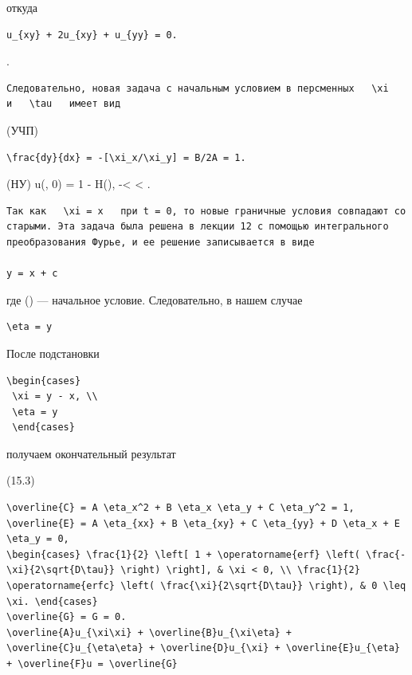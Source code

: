 \documentclass[
  ukrainian,
]{article}
\begin{document}
откуда

\begin{verbatim}
u_{xy} + 2u_{xy} + u_{yy} = 0.
\end{verbatim}

.

\begin{verbatim}
Следовательно, новая задача с начальным условием в персменных   \xi   и   \tau   имеет вид
\end{verbatim}

(УЧП)

\begin{verbatim}
\frac{dy}{dx} = -[\xi_x/\xi_y] = B/2A = 1.
\end{verbatim}

(НУ) u(\xi, 0) = 1 - H(\xi), \quad -\infty \textless{} \xi \textless{}
\infty.

\begin{verbatim}
Так как   \xi = x   при t = 0, то новые граничные условия совпадают со старыми. Эта задача была решена в лекции 12 с помощью интегрального преобразования Фурье, и ее решение записывается в виде

y = x + c
\end{verbatim}

где \phi(\beta) --- начальное условие. Следовательно, в нашем случае

\begin{verbatim}
\eta = y
\end{verbatim}

После подстановки

\begin{verbatim}
\begin{cases}
 \xi = y - x, \\
 \eta = y
 \end{cases}
\end{verbatim}

получаем окончательный результат

(15.3)

\begin{verbatim}
\overline{C} = A \eta_x^2 + B \eta_x \eta_y + C \eta_y^2 = 1,
\overline{E} = A \eta_{xx} + B \eta_{xy} + C \eta_{yy} + D \eta_x + E \eta_y = 0,
\begin{cases} \frac{1}{2} \left[ 1 + \operatorname{erf} \left( \frac{-\xi}{2\sqrt{D\tau}} \right) \right], & \xi < 0, \\ \frac{1}{2} \operatorname{erfc} \left( \frac{\xi}{2\sqrt{D\tau}} \right), & 0 \leq \xi. \end{cases}
\overline{G} = G = 0.
\overline{A}u_{\xi\xi} + \overline{B}u_{\xi\eta} + \overline{C}u_{\eta\eta} + \overline{D}u_{\xi} + \overline{E}u_{\eta} + \overline{F}u = \overline{G}
\end{verbatim}
\end{document}
